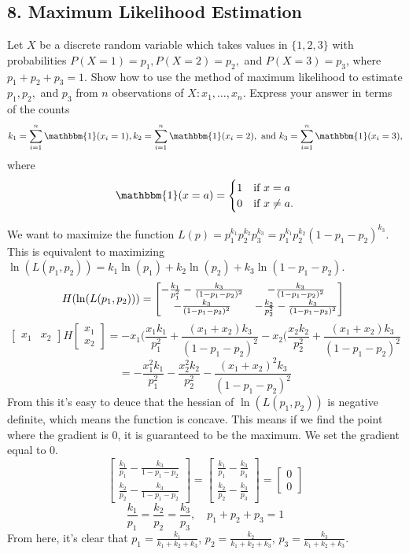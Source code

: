 \documentclass{article}
\begin{document}
\subsection*{8. Maximum Likelihood Estimation}
Let $X$ be a discrete random variable which takes values in $\{1, 2, 3\}$ with probabilities $P(X = 1) = p_1, P(X=2) = p_2,$ and $P(X = 3) = p_3$, where $p_1 + p_2 + p_3 = 1$.  Show how to use the method of maximum likelihood to estimate $p_1, p_2,$ and $p_3$ from $n$ observations of $X: x_1, \ldots, x_n$. Express your answer in terms of the counts $$k_1 = \sum_{i=1}^n \mathbbm{1}(x_i = 1), k_2 = \sum_{i=1}^n \mathbbm{1}(x_i = 2), \text{ and }k_3 = \sum_{i=1}^n \mathbbm{1}(x_i = 3),$$ where 
$$\mathbbm{1}(x = a) = 
\begin{cases}
1 & \text{if } x = a \\
0 & \text{if } x \neq a. 
\end{cases}$$
\begin{mdframed}
We want to maximize the function $L(p)=p_1^{k_1}p_2^{k_2}p_3^{k_3}=p_1^{k_1}p_2^{k_2}(1-p_1-p_2)^{k_3}$. This is equivalent to maximizing $\ln(L(p_1,p_2))=k_1\ln(p_1)+k_2\ln(p_2)+k_3\ln(1-p_1-p_2)$.
\[\scalebox{1}{$
H(\ln(L(p_1,p_2)))=
\begin{bmatrix}
-\frac{k_1}{p_1^2}-\frac{k_3}{(1-p_1-p_2)^2} &
-\frac{k_3}{(1-p_1-p_2)^2}\\-\frac{k_3}{(1-p_1-p_2)^2} &
-\frac{k_2}{p_2^2}-\frac{k_3}{(1-p_1-p_2)^2}
\end{bmatrix}$
}
\]
\[
\begin{bmatrix}
x_1&x_2
\end{bmatrix}
H
\begin{bmatrix}
x_1\\x_2
\end{bmatrix}
=
-x_1(\frac{x_1k_1}{p_1^2}+\frac{(x_1+x_2)k_3}{(1-p_1-p_2)^2}-x_2(\frac{x_2k_2}{p_2^2}+\frac{(x_1+x_2)k_3}{(1-p_1-p_2)^2}
\]
\[
=-\frac{x_1^2k_1}{p_1^2}-\frac{x_2^2k_2}{p_2^2}-\frac{(x_1+x_2)^2k_3}{(1-p_1-p_2)^2}
\]
From this it's easy to deuce that the hessian of $\ln(L(p_1,p_2))$ is negative definite, which means the function is concave. This means if we find the point where the gradient is $0$, it is guaranteed to be the maximum. We set the gradient equal to $0$.
\[
\begin{bmatrix}
\frac{k_1}{p_1}-\frac{k_3}{1-p_1-p_2}\\
\frac{k_2}{p_2}-\frac{k_3}{1-p_1-p_2}
\end{bmatrix}
=
\begin{bmatrix}
\frac{k_1}{p_1}-\frac{k_3}{p_3}\\
\frac{k_2}{p_2}-\frac{k_3}{p_3}
\end{bmatrix}
=\begin{bmatrix}0\\0\end{bmatrix}
\]
$$\frac{k_1}{p_1}=\frac{k_2}{p_2}=\frac{k_3}{p_3}, \quad p_1+p_2+p_3=1$$
From here, it's clear that $p_1=\frac{k_1}{k_1+k_2+k_3}$, $p_2=\frac{k_2}{k_1+k_2+k_3}$, $p_3=\frac{k_3}{k_1+k_2+k_3}$.
\end{mdframed}
\end{document}
